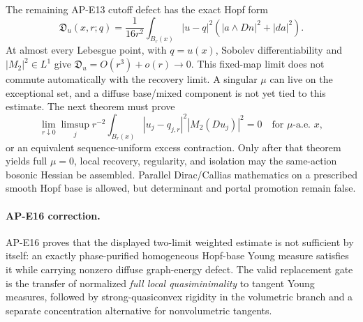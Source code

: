 The remaining AP-E13 cutoff defect has the exact Hopf form
\begin{equation}
 \mathfrak D_u(x,r;q)=\frac1{16r^2}\int_{B_r(x)}|u-q|^2
 (|a\wedge Dn|^2+|da|^2).
\end{equation}
At almost every Lebesgue point, with $q=u(x)$, Sobolev differentiability and
$|M_2|^2\in L^1$ give
$\mathfrak D_u=O(r^3)+o(r)\to0$.  This fixed-map limit does not commute
automatically with the recovery limit.  A singular $\mu$ can live on the
exceptional set, and a diffuse base/mixed component is not yet tied to this
estimate.  The next theorem must prove
\[
 \lim_{r\downarrow0}\limsup_j r^{-2}\int_{B_r(x)}
 |u_j-q_{j,r}|^2|M_2(Du_j)|^2=0
 \quad\text{for $\mu$-a.e.\ }x,
\]
or an equivalent sequence-uniform excess contraction.  Only after that
theorem yields full $\mu=0$, local recovery, regularity, and isolation may
the same-action bosonic Hessian be assembled.  Parallel Dirac/Callias
mathematics on a prescribed smooth Hopf base is allowed, but determinant and
portal promotion remain false.

\paragraph{AP-E16 correction.}
AP-E16 proves that the displayed two-limit weighted estimate is not
sufficient by itself: an exactly phase-purified homogeneous Hopf-base Young
measure satisfies it while carrying nonzero diffuse graph-energy defect.
The valid replacement gate is the transfer of normalized \emph{full local
quasiminimality} to tangent Young measures, followed by strong-quasiconvex
rigidity in the volumetric branch and a separate concentration alternative
for nonvolumetric tangents.
